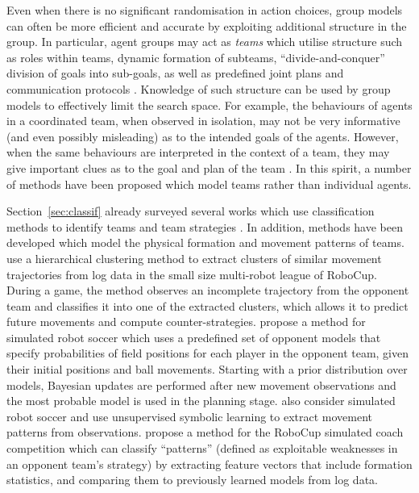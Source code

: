\documentclass[final,1p,times,authoryear]{elsarticle}
\begin{document}
Even when there is no significant randomisation in action choices, group models can often be more efficient and accurate by exploiting additional structure in the group. In particular, agent groups may act as \emph{teams} which utilise structure such as roles within teams, dynamic formation of subteams, ``divide-and-conquer'' division of goals into sub-goals, as well as predefined joint plans and communication protocols \citep{sv1999aij,t1997,gk1996,cl1991}. Knowledge of such structure can be used by group models to effectively limit the search space. For example, the behaviours of agents in a coordinated team, when observed in isolation, may not be very informative (and even possibly misleading) as to the intended goals of the agents. However, when the same behaviours are interpreted in the context of a team, they may give important clues as to the goal and plan of the team \citep{t1996}. In this spirit, a number of methods have been proposed which model teams rather than individual agents.

Section~\ref{sec:classif} already surveyed several works which use classification methods to identify teams and team strategies \citep{bdfe2010,lsma2009,ilsk2008,ss2007,s2004,rv2000}. In addition, methods have been developed which model the physical formation and movement patterns of teams. \citet{ev2011} use a hierarchical clustering method to extract clusters of similar movement trajectories from log data in the small size multi-robot league of RoboCup. During a game, the method observes an incomplete trajectory from the opponent team and classifies it into one of the extracted clusters, which allows it to predict future movements and compute counter-strategies. \citep{rv2001} propose a method for simulated robot soccer which uses a predefined set of opponent models that specify probabilities of field positions for each player in the opponent team, given their initial positions and ball movements. Starting with a prior distribution over models, Bayesian updates are performed after new movement observations and the most probable model is used in the planning stage. \citet{lmvh2005} also consider simulated robot soccer and use unsupervised symbolic learning to extract movement patterns from observations. \citet{kks2006} propose a method for the RoboCup simulated coach competition which can classify ``patterns'' (defined as exploitable weaknesses in an opponent team's strategy) by extracting feature vectors that include formation statistics, and comparing them to previously learned models from log data.
\end{document}
